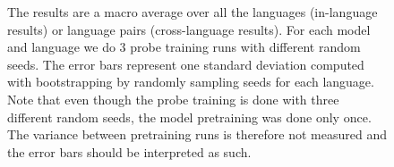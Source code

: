\begin{figure}
{    The results are a macro average over all the languages (in-language results) or language pairs (cross-language results). For each model and language we do 3 probe training runs with different random seeds. The error bars represent one standard deviation computed with bootstrapping by randomly sampling seeds for each language. Note that even though the probe training is done with three different random seeds, the model pretraining was done only once. The variance between pretraining runs is therefore not measured and the error bars should be interpreted as such.}
    \label{fig:probe_overall}
\end{figure}



